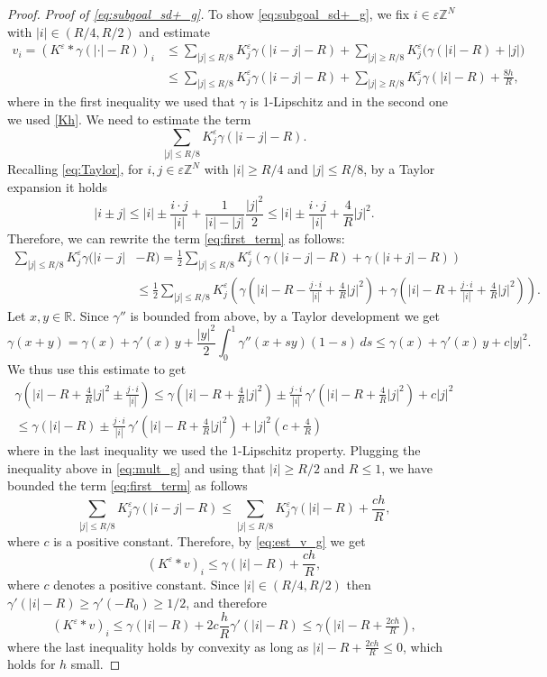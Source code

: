 \documentclass[10pt,a4paper]{amsart}
\newcommand{\R}{\mathbb{R}}
\newcommand{\Z}{\mathbb{Z}}
\newcommand{\e}{\varepsilon}
\newcommand{\ez}{\e\Z^N}
\newcommand{\g}{\gamma}
\begin{document}
\begin{proof}
\noindent\textit{Proof of \eqref{eq:subgoal_sd+_g}.} To show \eqref{eq:subgoal_sd+_g}, we fix $i\in\ez$ with $|i|\in (R/4,R/2)$  and  estimate 
\begin{equation}
    \begin{split}\label{eq:est_v_g}
    v_i=(K^\e\ast \g(|\cdot|-R))_i &\le  \sum_{|j|\le R/8} K^\e_j \g(|i-j|-R) +  \sum_{|j|\ge R/8} K^\e_j  \Big( \g(|i|-R)+|j|\Big) \\
    &\le \sum_{|j|\le R/8} K^\e_j \g(|i-j|-R) +  \sum_{|j|\ge R/8} K^\e_j \g(|i|-R) +\tfrac {8h}{R},
    \end{split}
\end{equation}
where  in the first inequality we used that $\g$ is 1-Lipschitz and in the second one we used \eqref{Kh}. We need to estimate the term
\begin{equation}\label{eq:first_term}
    \sum_{|j|\le R/8} K^\e_j \g(|i-j|-R).
\end{equation}
Recalling \eqref{eq:Taylor}, for $i,j\in\ez$ with  $|i|\ge R/4$ and $|j|\le R/8$,   {by a Taylor expansion} it holds 
\[
    |i\pm j|\le |i| \pm \frac{i\cdot j}{|i|} + \frac1{|i|-|j|}\frac{|j|^2}2 \le |i| \pm \frac{i\cdot j}{|i|} + \frac 4R |j|^2.
\] 
Therefore, we  can rewrite the term \eqref{eq:first_term} as follows:
\begin{equation}
    \begin{split}
        \sum_{|j|\le R/8} K^\e_j \g(|i-j|&-R) =\frac 12  \sum_{|j|\le R/8} K^\e_j (\g(|i-j|-R) +\g(|i+j|-R) ) \\
    &\le \frac 12  \sum_{|j|\le R/8} K^\e_j (\g(|i|-R -\tfrac{j\cdot i}{|i|} + \tfrac{4}{R} |j|^2 ) +\g(|i|-R+\tfrac{j\cdot i}{|i|} + \tfrac{4}{R}|j|^2) ).\label{eq:mult_g}
    \end{split}
\end{equation}
Let $x,y\in \R$. Since $\g''$ is bounded from above, by a Taylor development we get 
\[
    \g( x+y)  = \g(x) +\g'(x)\, y + \frac{|y|^2}2 \int_0^1\g''(x +  sy)(1-s)\,ds\le \g(x) +\g'(x)\, y + c|y|^2.
\]
We  thus use this estimate to get  
\begin{multline*}
    \g(|i|-R + \tfrac{4}{R} |j|^2 \pm \tfrac{j\cdot i}{|i|}  ) \le  \g(|i|-R+ \tfrac{4}{R} |j|^2) \pm \frac{j\cdot i}{|i|}\, \g'(|i|-R+ \tfrac{4}{R} |j|^2) + c |j|^2\\
    \le    \g(|i|-R  ) \pm \frac{j\cdot i}{|i|} \, \g'(|i|-R+ \tfrac{4}{R} |j|^2) + |j|^2 (c+\tfrac 4{R})
\end{multline*}
where in the last inequality we used the 1-Lipschitz property. Plugging the inequality above in \eqref{eq:mult_g} and using that   $|i|\ge R/2$ and $R\le 1$, we have bounded the term \eqref{eq:first_term} as follows 
\[
\sum_{|j|\le R/8} K^\e_j \g(|i-j|-R)\le \sum_{|j|\le R/8} K^\e_j \g(|i|-R) + \frac{ch}R,
\]
where $c$ is a positive constant.  
Therefore, by \eqref{eq:est_v_g} we get 
\[
(K^\e\ast v)_i \le \g(|i|-R) +\frac{ch}R,
\]
where $c$ denotes a positive constant.  Since $|i|\in(R/4,R/2)$ then $\g'(|i|-R)\ge \g'(-R_0)\ge 1/2$, and therefore 
\[
(K^\e\ast v)_i \le \g(|i|-R) + 2c \frac{h}R\g'(|i|-R)\le \g(|i|-R+ \tfrac{2ch}R),
\]
where the last inequality holds by convexity as long as  $  |i|-R+\tfrac{2ch}R\le 0$, which holds for $h$ small.
\end{proof}
\end{document}

